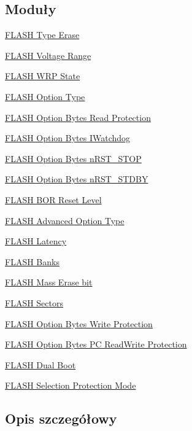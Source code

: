 \subsection*{Moduły}
\begin{DoxyCompactItemize}
\item 
\hyperlink{group___f_l_a_s_h_ex___type___erase}{F\+L\+A\+S\+H Type Erase}
\item 
\hyperlink{group___f_l_a_s_h_ex___voltage___range}{F\+L\+A\+S\+H Voltage Range}
\item 
\hyperlink{group___f_l_a_s_h_ex___w_r_p___state}{F\+L\+A\+S\+H W\+R\+P State}
\item 
\hyperlink{group___f_l_a_s_h_ex___option___type}{F\+L\+A\+S\+H Option Type}
\item 
\hyperlink{group___f_l_a_s_h_ex___option___bytes___read___protection}{F\+L\+A\+S\+H Option Bytes Read Protection}
\item 
\hyperlink{group___f_l_a_s_h_ex___option___bytes___i_watchdog}{F\+L\+A\+S\+H Option Bytes I\+Watchdog}
\item 
\hyperlink{group___f_l_a_s_h_ex___option___bytes__n_r_s_t___s_t_o_p}{F\+L\+A\+S\+H Option Bytes n\+R\+S\+T\+\_\+\+S\+T\+OP}
\item 
\hyperlink{group___f_l_a_s_h_ex___option___bytes__n_r_s_t___s_t_d_b_y}{F\+L\+A\+S\+H Option Bytes n\+R\+S\+T\+\_\+\+S\+T\+D\+BY}
\item 
\hyperlink{group___f_l_a_s_h_ex___b_o_r___reset___level}{F\+L\+A\+S\+H B\+O\+R Reset Level}
\item 
\hyperlink{group___f_l_a_s_h_ex___advanced___option___type}{F\+L\+A\+S\+H Advanced Option Type}
\item 
\hyperlink{group___f_l_a_s_h___latency}{F\+L\+A\+S\+H Latency}
\item 
\hyperlink{group___f_l_a_s_h_ex___banks}{F\+L\+A\+S\+H Banks}
\item 
\hyperlink{group___f_l_a_s_h_ex___mass_erase__bit}{F\+L\+A\+S\+H Mass Erase bit}
\item 
\hyperlink{group___f_l_a_s_h_ex___sectors}{F\+L\+A\+S\+H Sectors}
\item 
\hyperlink{group___f_l_a_s_h_ex___option___bytes___write___protection}{F\+L\+A\+S\+H Option Bytes Write Protection}
\item 
\hyperlink{group___f_l_a_s_h_ex___option___bytes___p_c___read_write___protection}{F\+L\+A\+S\+H Option Bytes P\+C Read\+Write Protection}
\item 
\hyperlink{group___f_l_a_s_h_ex___dual___boot}{F\+L\+A\+S\+H Dual Boot}
\item 
\hyperlink{group___f_l_a_s_h_ex___selection___protection___mode}{F\+L\+A\+S\+H Selection Protection Mode}
\end{DoxyCompactItemize}


\subsection{Opis szczegółowy}
